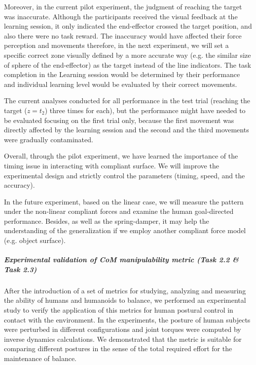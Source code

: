 Moreover, in the current pilot experiment, the judgment of reaching the target was inaccurate. Although the participants received the visual feedback at the learning session, it only indicated the end-effector crossed the target position, and also there were no task reward. The inaccuracy would have affected their force perception and movements \cite{Rank&DiLuca15} therefore, in the next experiment, we will set a specific correct zone visually defined by a more accurate way (e.g. the similar size of sphere of the end-effector) as the target instead of the line indicators. The task completion in the Learning session would be determined by their performance and individual learning level would be evaluated by their correct movements.

The current analyses conducted for all performance in the test trial (reaching the target ($z= t_2$) three times for each), but the performance might have needed to be evaluated focusing on the first trial only, because the first movement was directly affected by the learning session and the second and the third movements were gradually contaminated.

Overall, through the pilot experiment, we have learned the importance of the timing issue in interacting with compliant surface. We will improve the experimental design and strictly control the parameters (timing, speed, and the accuracy). 

In the future experiment, based on the linear case, we will measure the pattern under the non-linear compliant forces and examine the human goal-directed performance. Besides, as well as the spring-damper, it may help the understanding of the generalization if we employ another compliant force model (e.g. object surface).



\subparagraph{Experimental validation of CoM manipulability metric (Task 2.2 \& Task 2.3)}

After the introduction of a set of metrics for studying, analyzing and measuring the ability of humans and humanoids to balance, we performed an experimental study to verify the application of this metrics for human postural control in contact with the environment. In the experiments, the posture of human subjects were perturbed in different configurations and joint torques were computed by inverse dynamics calculations. We demonstrated that the metric is suitable for comparing different postures in the sense of the total required effort for the maintenance of balance.


